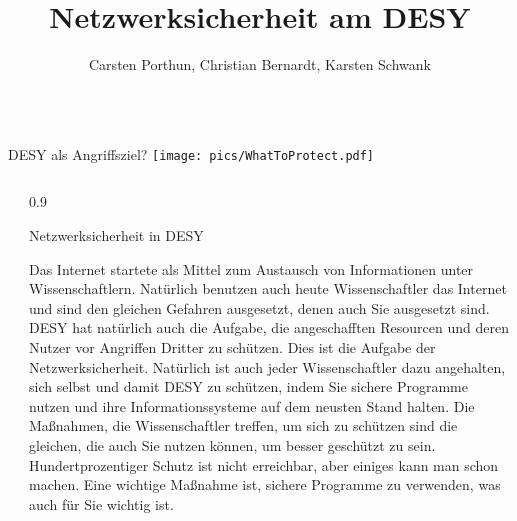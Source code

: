 \documentclass[final]{beamer}
\title{Netzwerksicherheit am DESY} %
\author{Carsten Porthun, Christian Bernardt, Karsten Schwank} %
\newlength{\sepwid}
\newlength{\twocolwid}
\begin{document}

\setlength{\belowcaptionskip}{2ex} %
\setlength\belowdisplayshortskip{2ex} %

\begin{frame}[t] %

\begin{columns}[b]

\begin{column}{0.95\textwidth}

\begin{alertblock}{DESY als Angriffsziel?}
\texttt{[image: pics/WhatToProtect.pdf]}
\end{alertblock}
\end{column}
\end{columns}

\begin{columns}[t, totalwidth=\textwidth] %

\begin{column}{\sepwid}\end{column} %

\begin{column}{0.9\twocolwid} %


\begin{block}{Netzwerksicherheit in DESY}

Das Internet startete als Mittel zum Austausch von Informationen
unter Wissenschaftlern. Natürlich benutzen auch heute Wissenschaftler das Internet und sind den gleichen
Gefahren ausgesetzt, denen auch Sie ausgesetzt sind. DESY hat natürlich auch die Aufgabe, die angeschafften
Resourcen und deren Nutzer vor Angriffen Dritter zu schützen. Dies ist die Aufgabe der Netzwerksicherheit. Natürlich ist auch jeder Wissenschaftler dazu angehalten, sich selbst und damit DESY zu schützen, indem Sie sichere Programme nutzen und ihre Informationssysteme auf dem neusten Stand halten. Die Maßnahmen, die Wissenschaftler treffen, um sich zu schützen sind die gleichen, die auch Sie nutzen können, um besser geschützt zu sein. Hundertprozentiger Schutz ist nicht erreichbar, aber einiges kann man schon machen. Eine wichtige Maßnahme ist, sichere Programme zu verwenden, was auch für Sie wichtig ist.


\end{block}
\end{column}
\end{columns}
\end{frame}
\end{document}
